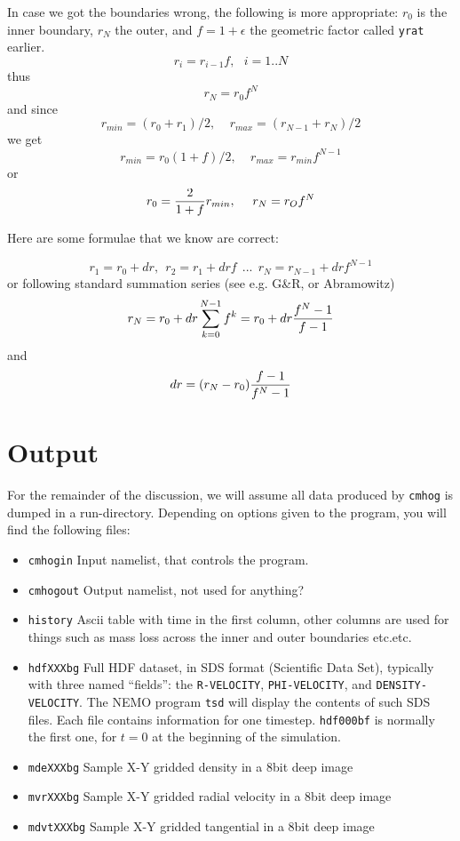 \documentclass[11pt,epsf]{article}
\begin{document}
In case we got the boundaries wrong, the following is more appropriate: 
$r_0$ is the inner boundary, $r_N$ the outer, and $f=1+\epsilon$ the
geometric factor called {\tt yrat} earlier.
$$
r_i = r_{i-1} f, ~~~ i=1..N
$$
thus
$$
r_N = r_0 f^N
$$
and since
$$
r_{min} = (r_0+r_1)/2,     ~~~~~ r_{max} = (r_{N-1}+r_N)/2
$$
we get
$$
r_{min} = r_0 (1+f)/2,   ~~~~~ r_{max} = r_{min} f^{N-1}
$$
or
$$
r_0 = { 2 \over  { 1+f}}  r_{min}, ~~~~  r_N = r_O f^N
$$


Here are some formulae that we know are correct:

$$
      r_1 = r_0 + dr, ~~  r_2 = r_1 + dr f  ~~...~~ r_N = r_{N-1} + dr f^{N-1}
$$
or following standard summation series (see e.g. G\&R, or Abramowitz)
$$
	r_N = r_0 + dr \sum_{k=0}^{N-1}{f^k} = r_0 + dr { {f^N-1} \over { f - 1 }}
$$
and
$$
     dr =  (r_N - r_0) { {f-1} \over { f^N - 1 }}
$$



\section{Output}

For the remainder of the discussion, we will assume all data produced
by {\tt cmhog} is dumped in a run-directory. 
Depending on options given to the program, you will find the following files:

\begin{itemize}

\item
{\tt cmhogin}
Input namelist, that controls the program.

\item
{\tt cmhogout}
Output namelist, not used for anything?

\item
{\tt history}
Ascii table with time in the first column, other columns 
are used for things such as mass loss across the inner and 
outer boundaries etc.etc.

\item
{\tt hdfXXXbg}
Full HDF dataset, in SDS format (Scientific Data Set), typically
with three named ``fields'': the 
{\tt R-VELOCITY}, {\tt PHI-VELOCITY}, and {\tt DENSITY-VELOCITY}.
The NEMO program {\tt tsd} will display the contents of
such SDS files. Each file contains information for one timestep.
{\tt hdf000bf} is normally the first one, for $t=0$ at the beginning
of the simulation.

\item
{\tt mdeXXXbg}
Sample X-Y gridded density in a 8bit deep image

\item
{\tt mvrXXXbg}
Sample X-Y gridded radial velocity in a 8bit deep image

\item
{\tt mdvtXXXbg}
Sample X-Y gridded tangential in a 8bit deep image

\end{itemize}
\end{document}
